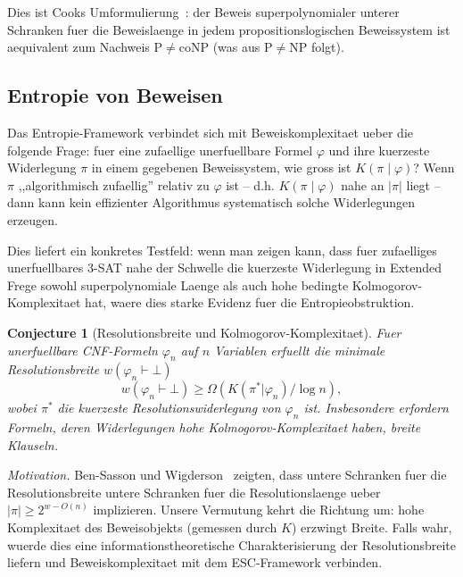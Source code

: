 \documentclass[aps,prd,twocolumn,superscriptaddress,nofootinbib]{revtex4-2}
\newtheorem{conjecture}[theorem]{Conjecture}
\theoremstyle{definition}
\theoremstyle{remark}
\newcommand{\NP}{\mathrm{NP}}
\newcommand{\PP}{\mathrm{P}}
\newcommand{\coNP}{\mathrm{coNP}}
\begin{document}
Dies ist Cooks Umformulierung~\cite{Cook1975}: der Beweis superpolynomialer unterer Schranken fuer die Beweislaenge in jedem propositionslogischen Beweissystem ist aequivalent zum Nachweis $\PP \neq \coNP$ (was aus $\PP \neq \NP$ folgt).

\subsection{Entropie von Beweisen}

Das Entropie-Framework verbindet sich mit Beweiskomplexitaet ueber die folgende Frage: fuer eine zufaellige unerfuellbare Formel $\varphi$ und ihre kuerzeste Widerlegung $\pi$ in einem gegebenen Beweissystem, wie gross ist $K(\pi \mid \varphi)$? Wenn $\pi$ ,,algorithmisch zufaellig'' relativ zu $\varphi$ ist -- d.h. $K(\pi \mid \varphi)$ nahe an $|\pi|$ liegt -- dann kann kein effizienter Algorithmus systematisch solche Widerlegungen erzeugen.

Dies liefert ein konkretes Testfeld: wenn man zeigen kann, dass fuer zufaelliges unerfuellbares $3$-SAT nahe der Schwelle die kuerzeste Widerlegung in Extended Frege sowohl superpolynomiale Laenge als auch hohe bedingte Kolmogorov-Komplexitaet hat, waere dies starke Evidenz fuer die Entropieobstruktion.

\begin{conjecture}[Resolutionsbreite und Kolmogorov-Komplexitaet]
\label{conj:resolution-width}
Fuer unerfuellbare CNF-Formeln $\varphi_n$ auf $n$ Variablen erfuellt die minimale Resolutionsbreite $w(\varphi_n \vdash \bot)$
\[
w(\varphi_n \vdash \bot) \geq \Omega\left( K(\pi^* | \varphi_n) / \log n \right),
\]
wobei $\pi^*$ die kuerzeste Resolutionswiderlegung von $\varphi_n$ ist. Insbesondere erfordern Formeln, deren Widerlegungen hohe Kolmogorov-Komplexitaet haben, breite Klauseln.
\end{conjecture}

\textit{Motivation.} Ben-Sasson und Wigderson~\cite{BenSasson2001} zeigten, dass untere Schranken fuer die Resolutionsbreite untere Schranken fuer die Resolutionslaenge ueber $|\pi| \geq 2^{w - O(n)}$ implizieren. Unsere Vermutung kehrt die Richtung um: hohe Komplexitaet des Beweisobjekts (gemessen durch $K$) erzwingt Breite. Falls wahr, wuerde dies eine informationstheoretische Charakterisierung der Resolutionsbreite liefern und Beweiskomplexitaet mit dem ESC-Framework verbinden.
\end{document}
